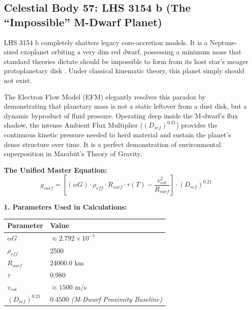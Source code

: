 \documentclass[11pt, a4paper]{article}
\begin{document}
\clearpage
\subsection{Celestial Body 57: LHS 3154 b (The ``Impossible'' M-Dwarf Planet)}
  LHS 3154 b completely shatters legacy core-accretion models. It is a Neptune-sized exoplanet orbiting a very dim red dwarf, possessing a minimum mass that standard theories dictate should be impossible to form from its host star's meager protoplanetary disk \cite{gu2023}. Under classical kinematic theory, this planet simply should not exist.

  The Electron Flow Model (EFM) elegantly resolves this paradox by demonstrating that planetary mass is not a static leftover from a dust disk, but a dynamic byproduct of fluid pressure. Operating deep inside the M-dwarf's flux shadow, the intense Ambient Flux Multiplier ($(D_{ref})^{0.21}$) provides the continuous kinetic pressure needed to herd material and sustain the planet's dense structure over time. It is a perfect demonstration of environmental superposition in Marab\={u}t's Theory of Gravity.

  \vspace{0.5em}
  \noindent \textbf{The Unified Master Equation:}
  $$ g_{surf} = \left[ (\alpha G) \cdot \rho_{eff} \cdot R_{surf} \cdot \tau(T) - \frac{v_{rot}^2}{R_{surf}} \right] \cdot (D_{ref})^{0.21} $$

  \vspace{0.5em}
  \noindent \textbf{1. Parameters Used in Calculations:} \\[0.5em]
  \begingroup
  \renewcommand{\arraystretch}{1.3}
  \hspace*{2em}
  \begin{tabular}{|l|l|}
    \hline
    \textbf{Parameter} & \textbf{Value} \\ \hline
    $\alpha G$ & $\approx 2.792 \times 10^{-7}$ \\ \hline
    $\rho_{eff}$ & 2500 \\ \hline
    $R_{surf}$ & 24000.0 km \\ \hline
    $\tau$ & 0.980 \\ \hline
    $v_{rot}$ & $\approx 1500$ m/s \\ \hline
    $(D_{ref})^{0.21}$ & $0.4500$ \textit{(M-Dwarf Proximity Baseline)} \\ \hline
  \end{tabular}
  \endgroup
\end{document}
